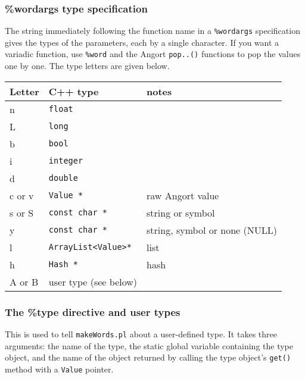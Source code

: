 \clearpage
\subsubsection{\%wordargs type specification}
The string immediately following the function name in a \texttt{\%wordargs}
specification gives the types of the parameters, each by a single
character. If you want a variadic function, use \texttt{\%word} and
the Angort \texttt{pop..()} functions to pop the values one by one.
The type letters are given below.
\begin{center}
\begin{tabular}{|l|l|l|} \hline
Letter & C++ type & notes \\ \hline
n & \texttt{float} & \\
L & \texttt{long} & \\
b & \texttt{bool} & \\
i & \texttt{integer} & \\
d & \texttt{double} &\\
c or v  & \texttt{Value *} & raw Angort value\\
s or S & \texttt{const char *} & string or symbol \\
y & \texttt{const char *} & string, symbol or none (NULL)\\
l & \texttt{ArrayList<Value>*} & list \\
h & \texttt{Hash *} & hash \\
A or B & user type (see below) & \\ \hline
\end{tabular}
\end{center}

\subsubsection{The \%type directive and user types}
This is used to tell \texttt{makeWords.pl} about a user-defined
type. It takes three arguments: the name of the type,
the static global variable containing the type object,
and the name of the object returned by calling the type object's
\texttt{get()} method with a \texttt{Value} pointer.

